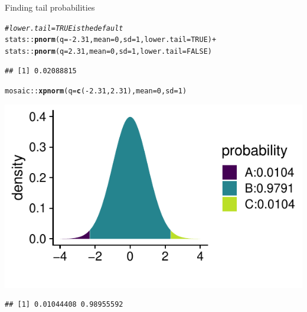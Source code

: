 \documentclass[10pt]{beamer}\usepackage[]{graphicx}\usepackage[]{color}
\makeatletter
\newcommand{\hlnum}[1]{\textcolor[rgb]{0.686,0.059,0.569}{#1}}%
\newcommand{\hlcom}[1]{\textcolor[rgb]{0.678,0.584,0.686}{\textit{#1}}}%
\newcommand{\hlopt}[1]{\textcolor[rgb]{0,0,0}{#1}}%
\newcommand{\hlstd}[1]{\textcolor[rgb]{0.345,0.345,0.345}{#1}}%
\newcommand{\hlkwc}[1]{\textcolor[rgb]{0.333,0.667,0.333}{#1}}%
\newcommand{\hlkwd}[1]{\textcolor[rgb]{0.737,0.353,0.396}{\textbf{#1}}}%
\newenvironment{kframe}{%
 \def\at@end@of@kframe{}%
 \ifinner\ifhmode%
  \def\at@end@of@kframe{\end{minipage}}%
  \begin{minipage}{\columnwidth}%
 \fi\fi%
 \def\FrameCommand##1{\hskip\@totalleftmargin \hskip-\fboxsep
 \colorbox{shadecolor}{##1}\hskip-\fboxsep
     \hskip-\linewidth \hskip-\@totalleftmargin \hskip\columnwidth}%
 \MakeFramed {\advance\hsize-\width
   \@totalleftmargin\z@ \linewidth\hsize
   \@setminipage}}%
 {\par\unskip\endMakeFramed%
 \at@end@of@kframe}
\newenvironment{knitrout}{}{} %
\makeatother
\begin{document}
\begin{frame}[fragile]{Finding tail probabilities}
	
	
	
\begin{knitrout}\tiny
{}\color{fgcolor}\begin{kframe}
\begin{alltt}
\hlcom{# lower.tail = TRUE is the default}
\hlstd{stats}\hlopt{::}\hlkwd{pnorm}\hlstd{(}\hlkwc{q} \hlstd{=} \hlopt{-}\hlnum{2.31}\hlstd{,} \hlkwc{mean} \hlstd{=} \hlnum{0}\hlstd{,} \hlkwc{sd} \hlstd{=} \hlnum{1}\hlstd{,} \hlkwc{lower.tail} \hlstd{=} \hlnum{TRUE}\hlstd{)} \hlopt{+}
\hlstd{stats}\hlopt{::}\hlkwd{pnorm}\hlstd{(}\hlkwc{q} \hlstd{=} \hlnum{2.31}\hlstd{,} \hlkwc{mean} \hlstd{=} \hlnum{0}\hlstd{,} \hlkwc{sd} \hlstd{=} \hlnum{1}\hlstd{,} \hlkwc{lower.tail} \hlstd{=} \hlnum{FALSE}\hlstd{)}
\end{alltt}
\begin{verbatim}
## [1] 0.02088815
\end{verbatim}
\end{kframe}
\end{knitrout}
	
	\pause 
	
\begin{knitrout}\tiny
{}\color{fgcolor}\begin{kframe}
\begin{alltt}
\hlstd{mosaic}\hlopt{::}\hlkwd{xpnorm}\hlstd{(}\hlkwc{q} \hlstd{=} \hlkwd{c}\hlstd{(}\hlopt{-}\hlnum{2.31}\hlstd{,}\hlnum{2.31}\hlstd{),} \hlkwc{mean} \hlstd{=} \hlnum{0}\hlstd{,} \hlkwc{sd} \hlstd{=} \hlnum{1}\hlstd{)}
\end{alltt}
\end{kframe}

{\centering \includegraphics[width=0.6\linewidth]{figure/probs7-1} 

}


\begin{kframe}\begin{verbatim}
## [1] 0.01044408 0.98955592
\end{verbatim}
\end{kframe}
\end{knitrout}
	
	
\end{frame}
\end{document}
